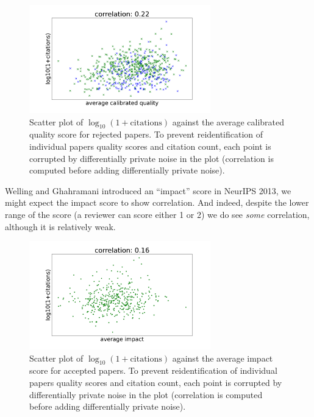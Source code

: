\begin{figure}[htb]
\includegraphics[width=0.70\textwidth]{diagrams/neurips/citations-vs-average-calibrated-quality-reject.pdf}


\caption{Scatter plot of $\log_{10}(1+\text{citations})$ against the average calibrated quality score for rejected papers. To prevent reidentification of individual papers quality scores and citation count, each point is corrupted by differentially private noise in the plot (correlation is computed before adding differentially private noise).}
\label{citations-vs-average-calibrated-quality-reject}
\end{figure}

Welling and Ghahramani introduced an ``impact'' score in NeurIPS 2013,
we might expect the impact score to show correlation. And indeed,
despite the lower range of the score (a reviewer can score either 1 or
2) we do see \emph{some} correlation, although it is relatively weak.

\begin{figure}[htb]
\includegraphics[width=0.70\textwidth]{diagrams/neurips/citations-vs-average-impact-accept.pdf}


\caption{Scatter plot of $\log_{10}(1+\text{citations})$ against the average impact score for accepted papers. To prevent reidentification of individual papers quality scores and citation count, each point is corrupted by differentially private noise in the plot (correlation is computed before adding differentially private noise).}
\label{citations-vs-average-impact-accept}
\end{figure}

